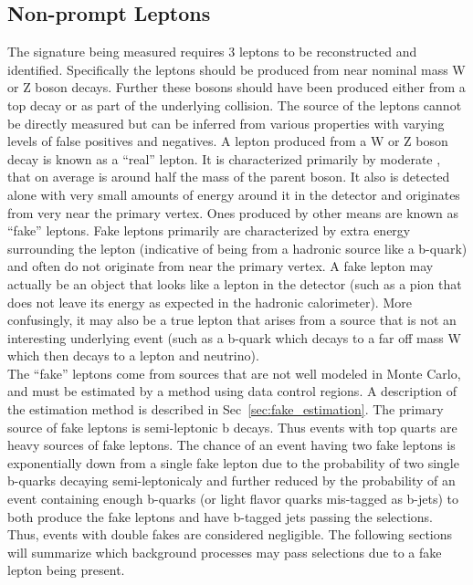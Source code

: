 	
	
	
		\subsection{Non-prompt Leptons}		
		The \ttZ signature being measured requires 3 leptons to be reconstructed and identified. Specifically the leptons should be produced from near nominal mass W or Z boson decays. Further these bosons should have been produced either from a top decay or as part of the underlying collision. The source of the leptons cannot be directly measured but can be inferred from various properties with varying levels of false positives and negatives. A lepton produced from a W or Z boson decay is known as a ``real'' lepton. It is characterized primarily by moderate \pt, that on average is around half the mass of the parent boson. It also is detected alone with very small amounts of energy around it in the detector and originates from very near the primary vertex. Ones produced by other means are known as ``fake'' leptons. Fake leptons primarily are characterized by extra energy surrounding the lepton (indicative of being from a hadronic source like a b-quark) and often do not originate from near the primary vertex. A fake lepton may actually be an object that looks like a lepton in the detector (such as a pion that does not leave its energy as expected in the hadronic calorimeter). More confusingly, it may also be a true lepton that arises from a source that is not an interesting underlying event (such as a b-quark which decays to a far off mass W which then decays to a lepton and neutrino).\\
		
		The ``fake'' leptons come from sources that are not well modeled in Monte Carlo, and must be estimated by a method using data control regions. A description of the estimation method is described in Sec~\ref{sec:fake_estimation}. The primary source of fake leptons is semi-leptonic b decays. Thus events with top quarts are heavy sources of fake leptons. %
The chance of an event having two fake leptons is exponentially down from a single fake lepton due to the probability of two single b-quarks decaying semi-leptonicaly and further reduced by the probability of an event containing enough b-quarks (or light flavor quarks mis-tagged as b-jets) to both produce the fake leptons and have b-tagged jets passing the selections. Thus,  events with double fakes are considered negligible. The following sections will summarize which background processes may pass selections due to a fake lepton being present.\\
		
